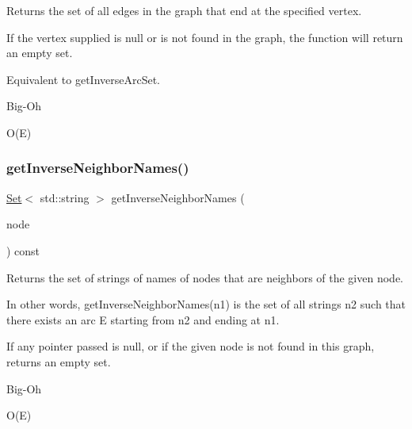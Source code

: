 Returns the set of all edges in the graph that end at the specified vertex. 

If the vertex supplied is null or is not found in the graph, the function will return an empty set.

Equivalent to get\+Inverse\+Arc\+Set. \begin{DoxyRefDesc}{Big-\/\+Oh}
\item[\mbox{\hyperlink{BigOh__BigOh000025}{Big-\/\+Oh}}]O(\+E) \end{DoxyRefDesc}
\mbox{\label{classGraph_aa9eceee00e824ea4852449fa3de61e82}} 
\subsubsection{\texorpdfstring{get\+Inverse\+Neighbor\+Names()}{getInverseNeighborNames()}\hspace{0.1cm}{\footnotesize\ttfamily [1/2]}}
{\footnotesize\ttfamily \mbox{\hyperlink{classSet}{Set}}$<$ std\+::string $>$ get\+Inverse\+Neighbor\+Names (\begin{DoxyParamCaption}\item[{\mbox{\hyperlink{classVertexGen}{Vertex\+Gen}}$<$ V, E $>$  $\ast$}]{node }\end{DoxyParamCaption}) const\hspace{0.3cm}{\ttfamily [inherited]}}



Returns the set of strings of names of nodes that are neighbors of the given node. 

In other words, get\+Inverse\+Neighbor\+Names(n1) is the set of all strings n2 such that there exists an arc E starting from n2 and ending at n1.

If any pointer passed is null, or if the given node is not found in this graph, returns an empty set. \begin{DoxyRefDesc}{Big-\/\+Oh}
\item[\mbox{\hyperlink{BigOh__BigOh000067}{Big-\/\+Oh}}]O(\+E) \end{DoxyRefDesc}
\mbox{\label{classGraph_ac3dc36bc1eb0f249180cfe78bce6e7a2}} 
